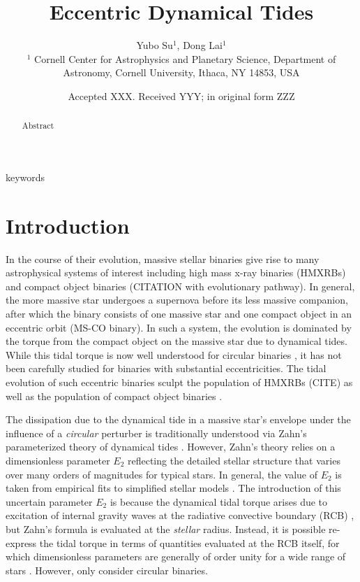 \documentclass[
        fleqn,
        usenatbib,
    ]{mnras}
\title[Eccentric Dynamical Tides]{Eccentric Dynamical Tides}
\author[Y. Su, D. Lai.]{
Yubo Su$^1$,
Dong Lai$^1$
\\
$^1$ Cornell Center for Astrophysics and Planetary Science, Department of
Astronomy, Cornell University, Ithaca, NY 14853, USA
}
\date{Accepted XXX\@. Received YYY\@; in original form ZZZ}
\begin{document}
\label{firstpage}
\pagerange{\pageref{firstpage}--\pageref{lastpage}}
\maketitle

\begin{abstract}
    Abstract
\end{abstract}

\begin{keywords}
keywords %
\end{keywords}

\section{Introduction}

In the course of their evolution, massive stellar binaries give rise to many
astrophysical systems of interest including high mass x-ray binaries (HMXRBs)
and compact object binaries (CITATION with evolutionary pathway). In general,
the more massive star undergoes a supernova before its less massive companion,
after which the binary consists of one massive star and one compact object in an
eccentric orbit (MS-CO binary). In such a system, the evolution is dominated by
the torque from the compact object on the massive star due to dynamical tides.
While this tidal torque is now well understood for circular binaries
\citep{kushnir}, it has not been carefully studied for binaries with substantial
eccentricities. The tidal evolution of such eccentric binaries sculpt the
population of HMXRBs (CITE) as well as the population of compact object binaries
\citep{vigna2020common}.

The dissipation due to the dynamical tide in a massive star's envelope under the
influence of a \emph{circular} perturber is traditionally understood via Zahn's
parameterized theory of dynamical tides \citep{zahn1975dynamical}. However,
Zahn's theory relies on a dimensionless parameter $E_2$ reflecting the detailed
stellar structure that varies over many orders of magnitudes for typical stars.
In general, the value of $E_2$ is taken from empirical fits to simplified
stellar models \citep{hurley2002evolution, vigna2020common}. The introduction of
this uncertain parameter $E_2$ is because the dynamical tidal torque arises due
to excitation of internal gravity waves at the radiative convective boundary
(RCB) \citep{goldreich1989tidal, savonije1983tidal}, but Zahn's formula is
evaluated at the \emph{stellar} radius. Instead, it is possible re-express the
tidal torque in terms of quantities evaluated at the RCB itself, for which
dimensionless parameters are generally of order unity for a wide range of stars
\citep{kushnir}. However, \citet{kushnir} only consider circular binaries.
\end{document}
